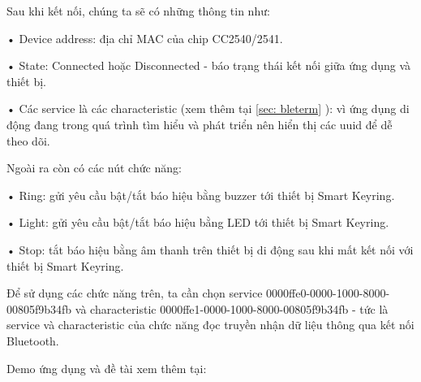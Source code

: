 	Sau khi kết nối, chúng ta sẽ có những thông tin như:
	
	• Device address: địa chỉ MAC của chip CC2540/2541.
	
	• State: Connected hoặc Disconnected -  báo trạng thái kết nối giữa ứng dụng và thiết bị.
	
	• Các service là các characteristic (xem thêm tại \ref{sec: bleterm} ): vì ứng dụng di động đang trong quá trình tìm hiểu và phát triển nên hiển thị các uuid để dễ theo dõi.
	
	Ngoài ra còn có các nút chức năng:
	
	• Ring: gửi yêu cầu bật/tắt báo hiệu bằng buzzer tới thiết bị Smart Keyring.
	
	• Light: gửi yêu cầu bật/tắt báo hiệu bằng LED tới thiết bị Smart Keyring.
	
	• Stop: tắt báo hiệu bằng âm thanh trên thiết bị di động sau khi mất kết nối với thiết bị Smart Keyring.
	
	Để sử dụng các chức năng trên, ta cần chọn service 0000ffe0-0000-1000-8000-00805f9b34fb và characteristic 0000ffe1-0000-1000-8000-00805f9b34fb - tức là service và characteristic của chức năng đọc truyền nhận dữ liệu thông qua kết nối Bluetooth.
	
	Demo ứng dụng và đề tài xem thêm tại: 

